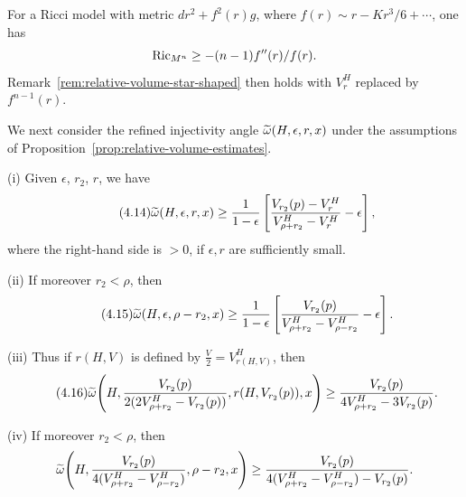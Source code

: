 \begin{remark}
\label{rem:ricci-models}

For a Ricci model with metric $dr^2+f^2(r)g$, where
$f(r)\sim r-Kr^3/6+\cdots$, one has
\[
\operatorname{Ric}_{M^n}\geq -(n-1)f''(r)/f(r).
\]
Remark~\ref{rem:relative-volume-star-shaped} then holds with $V_r^H$ replaced by $f^{n-1}(r)$.
\end{remark}

We next consider the refined injectivity angle $\widetilde{\omega}(H,\epsilon,r,x)$
under the assumptions of Proposition~\ref{prop:relative-volume-estimates}.

\begin{proposition}
\label{prop:refined-injectivity-angle-lower-estimates}

\textup{(i)} Given $\epsilon$, $r_2$, $r$, we have
\begin{equation}\tag{4.14}
\widetilde{\omega}(H,\epsilon,r,x)\ge \frac{1}{1-\epsilon}
\left[\frac{V_{r_2}(p)-V_r^H}{V^H_{\rho+r_2}-V_r^H}-\epsilon\right],
\end{equation}
where the right-hand side is $>0$, if $\epsilon,r$ are sufficiently small.

\textup{(ii)} If moreover $r_2<\rho$, then
\begin{equation}\tag{4.15}
\widetilde{\omega}(H,\epsilon,\rho-r_2,x)\ge \frac{1}{1-\epsilon}
\left[\frac{V_{r_2}(p)}{V^H_{\rho+r_2}-V^H_{\rho-r_2}}-\epsilon\right].
\end{equation}

\textup{(iii)} Thus if $r(H,V)$ is defined by $\frac{V}{2}=V^H_{r(H,V)}$, then
\begin{equation}\tag{4.16}
\widetilde{\omega}\!\left(H,\frac{V_{r_2}(p)}{2(2V^H_{\rho+r_2}-V_{r_2}(p))},r(H,V_{r_2}(p)),x\right)
\ge \frac{V_{r_2}(p)}{4V^H_{\rho+r_2}-3V_{r_2}(p)}.
\end{equation}

\textup{(iv)} If moreover $r_2<\rho$, then
\[
\widetilde{\omega}\!\left(H,\frac{V_{r_2}(p)}{4(V^H_{\rho+r_2}-V^H_{\rho-r_2})},\rho-r_2,x\right)
\ge \frac{V_{r_2}(p)}{4(V^H_{\rho+r_2}-V_{\rho-r_2}^H)-V_{r_2}(p)}.
\]
\end{proposition}

